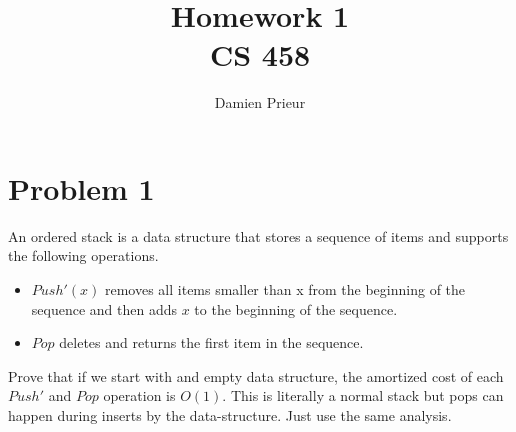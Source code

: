\documentclass{article}
\author{Damien Prieur}
\title{Homework 1 \\ CS 458}
\date{}
\begin{document}
\maketitle

\section*{Problem 1}
An ordered stack is a data structure that stores a sequence of items and supports the following operations.
\begin{itemize}
\item $Push'(x)$ removes all items smaller than x from the beginning of the sequence and then adds $x$ to the beginning of the sequence.
\item $Pop$ deletes and returns the first item in the sequence.
\end{itemize}
\indent Prove that if we start with and empty data structure, the amortized cost of each $Push'$ and $Pop$ operation is $O(1)$.
\newline
\newline
\indent This is literally a normal stack but pops can happen during inserts by the data-structure. Just use the same analysis.

\newpage
\end{document}
